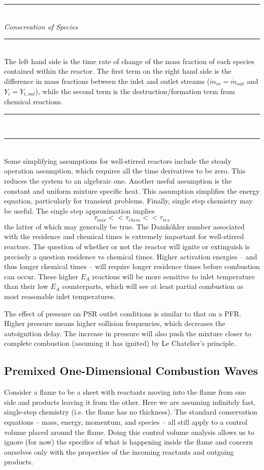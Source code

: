 \documentclass[11pt]{article}
\newcommand{\Header}[1]{\noindent\rule{\textwidth}{0.4pt}\\[0.3cm]\indent \large{\textit{#1}}\normalsize{}\\[-0.1cm]\noindent\rule{\textwidth}{0.4pt}}
\begin{document}
\Header{Conservation of Species}\\

The left hand side is the time rate of change of the mass fraction of each species contained within the reactor. The first term on the right hand side is the difference in mass fractions between the inlet and outlet streams ($\dot m_{in} = \dot m_{out}$ and $Y_i = Y_{i,out}$), while the second term is the destruction/formation term from chemical reactions.

\noindent\rule{\textwidth}{0.4pt}\\
\noindent\rule{\textwidth}{0.4pt}\\[0.3cm]


Some simplifying assumptions for well-stirred reactors include the steady operation assumption, which requires all the time derivatives to be zero. This reduces the system to an algebraic one. Another useful assumption is the constant and uniform mixture specific heat. This assumption simplifies the energy equation, particularly for transient problems. Finally, single step chemistry may be useful. The single step approximation implies
$$\tau_{mix} << \tau_{chem} << \tau_{res}$$
the latter of which may generally be true. The Damk{\"o}hler number associated with the residence and chemical times is extremely important for well-stirred reactors. The question of whether or not the reactor will ignite or extinguish is precisely a question residence vs chemical times. Higher activation energies -- and thus longer chemical times -- will require longer residence times before combustion can occur. These higher $E_A$ reactions will be more sensitive to inlet temperature than their low $E_A$ counterparts, which will see at least partial combustion as most reasonable inlet temperatures.

The effect of pressure on PSR outlet conditions is similar to that on a PFR. Higher pressure means higher collision frequencies, which decreases the autoignition delay. The increase in pressure will also push the mixture closer to complete combustion (assuming it has ignited) by Le Chatelier's principle.

\subsection{Premixed One-Dimensional Combustion Waves}
Consider a flame to be a sheet with reactants moving into the flame from one side and products leaving it from the other. Here we are assuming infinitely fast, single-step chemistry (i.e. the flame has no thickness). The standard conservation equations -- mass, energy, momentum, and species -- all still apply to a control volume placed around the flame. Doing this control volume analysis allows us to ignore (for now) the specifics of what is happening inside the flame and concern ourselves only with the properties of the incoming reactants and outgoing products.
\end{document}
